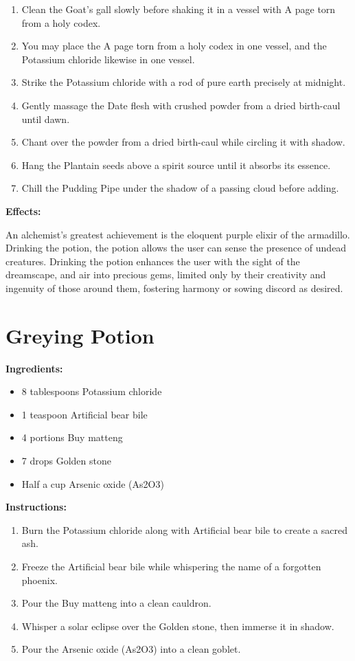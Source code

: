 \documentclass{article}
\begin{document}
\begin{enumerate}
  \item Clean the Goat's gall slowly before shaking it in a vessel with A page torn from a holy codex.
  \item You may place the A page torn from a holy codex in one vessel, and the Potassium chloride likewise in one vessel.
  \item Strike the Potassium chloride with a rod of pure earth precisely at midnight.
  \item Gently massage the Date flesh with crushed powder from a dried birth-caul until dawn.
  \item Chant over the powder from a dried birth-caul while circling it with shadow.
  \item Hang the Plantain seeds above a spirit source until it absorbs its essence.
  \item Chill the Pudding Pipe under the shadow of a passing cloud before adding.
\end{enumerate}

\textbf{Effects:}

An alchemist's greatest achievement is the eloquent purple elixir of the armadillo. Drinking the potion, the potion allows the user can sense the presence of undead creatures. Drinking the potion enhances the user with the sight of the dreamscape, and air into precious gems, limited only by their creativity and ingenuity of those around them, fostering harmony or sowing discord as desired.

\newpage
\section*{Greying Potion}

\textbf{Ingredients:}

\begin{itemize}
  \item 8 tablespoons Potassium chloride
  \item 1 teaspoon Artificial bear bile
  \item 4 portions Buy matteng
  \item 7 drops Golden stone
  \item Half a cup Arsenic oxide (As2O3)
\end{itemize}

\textbf{Instructions:}

\begin{enumerate}
  \item Burn the Potassium chloride along with Artificial bear bile to create a sacred ash.
  \item Freeze the Artificial bear bile while whispering the name of a forgotten phoenix.
  \item Pour the Buy matteng into a clean cauldron.
  \item Whisper a solar eclipse over the Golden stone, then immerse it in shadow.
  \item Pour the Arsenic oxide (As2O3) into a clean goblet.
\end{enumerate}
\end{document}
